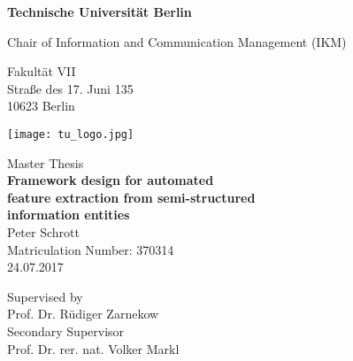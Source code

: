 \thispagestyle{empty}
\begin{center}

\vspace*{1.2cm}
{\LARGE \textbf{Technische Universität Berlin}}

\vspace{0.5cm}

{\large Chair of Information and Communication Management (IKM)\\[5mm]}

Fakultät VII\\
Straße des 17. Juni 135\\
10623 Berlin\\

\vspace*{1cm}

\texttt{[image: tu\_logo.jpg]}

\vspace*{1.0cm}

{\large Master Thesis}\\

\vspace{1.0cm}
{\LARGE \textbf{Framework design for automated}}\\
\vspace*{0.25cm}
{\LARGE \textbf{feature extraction from semi-structured}}\\
\vspace*{0.35cm}
{\LARGE \textbf{ information entities}}\\
\vspace*{1.0cm}
{\LARGE Peter Schrott}
\\
\vspace*{0.5cm}
Matriculation Number: 370314\\
24.07.2017\\ %
\vspace*{1.0cm}

Supervised by\\
Prof. Dr. Rüdiger Zarnekow\\
\vspace*{0.5cm}
Secondary Supervisor\\
Prof. Dr. rer. nat. Volker Markl
\vspace{3cm}

\end{center}